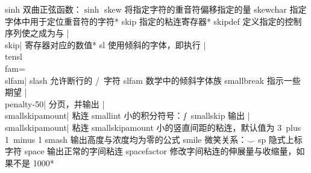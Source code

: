 \capcs sinh {双曲正弦函数：$\sinh$}{}{}
\capcs skew {将指定字符的重音符偏移指定的量}{}{}
\capcs skewchar {指定字体中用于定位重音符的字符}*{}
\capcs skip {指定的粘连寄存器}*{}
\capcs skipdef {定义指定的控制序列使之成为与 |\\skip| 寄存器对应的数值}*{}
\capcs sl {使用倾斜的字体，即执行 |\\tensl\\fam=\\slfam|}{}{}
\capcs slash {允许断行的 \slash\ 字符}{}{}
\capcs slfam {数学中的倾斜字体族}{}{}
\capcs smallbreak {指示一些期望 |\\penalty-50| 分页，并输出 |\\smallskipamount| 粘连}{}{}
\capcs smallint {小的积分符号：$\smallint$}{}{}
\capcs smallskip {输出 |\\smallskipamount| 粘连}{}{}
\capcs smallskipamount {小的竖直间距的粘连，默认值为 3\pt\ plus 1\pt\ minus 1\pt}{}{}
\capcs smash {输出高度与浓度均为零的公式}{}{}
\capcs smile {微笑关系：$\smile$}{}{}
\capcs sp {隐式上标字符}{}{}
\capcs space {输出正常的字间粘连}{}{}
\capcs spacefactor {修改字间粘连的伸展量与收缩量，如果不是 1000}*{}
